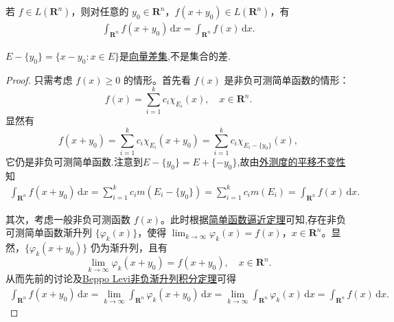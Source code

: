 \documentclass[../../main.tex]{subfiles}
\begin{document}
\begin{theorem}[积分变量的平移变换定理]\label{theorem:积分变量的平移变换定理}
若 $f \in L(\mathbf{R}^n)$，则对任意的 $y_0 \in \mathbf{R}^n$，$f(x + y_0) \in L(\mathbf{R}^n)$，有
\begin{align*}
\int_{\mathbf{R}^n} f(x + y_0) \, \mathrm{d}x = \int_{\mathbf{R}^n} f(x) \, \mathrm{d}x.
\end{align*}
\end{theorem}
\begin{remark}
$E-\{y_0\}=\{x-y_0:x\in E\}$是\hyperref[definition:向量差集]{向量差集},不是集合的差.
\end{remark}
\begin{proof}
只需考虑 $f(x) \geqslant 0$ 的情形。首先看 $f(x)$ 是非负可测简单函数的情形：
\[
f(x) = \sum_{i=1}^k c_i \chi_{E_i}(x), \quad x \in \mathbf{R}^n.
\]
显然有
\[
f(x+y_0)=\sum_{i=1}^k{c_i\chi _{E_i}(x+y_0)}=\sum_{i=1}^k{c_i\chi _{E_i-\{y_0\}}(x)},
\]
它仍是非负可测简单函数.注意到$E-\{y_0\}=E+\{-y_0\}$,故由\hyperref[theorem:外测度的平移不变性]{外测度的平移不变性}知
\begin{align*}
\int_{\mathbf{R}^n} f(x + y_0) \, \mathrm{d}x = \sum_{i=1}^k c_i m(E_i - \{ y_0 \})
= \sum_{i=1}^k c_i m(E_i) = \int_{\mathbf{R}^n} f(x) \, \mathrm{d}x.
\end{align*}

其次，考虑一般非负可测函数 $f(x)$。此时根据\hyperref[theorem:简单函数逼近定理]{简单函数逼近定理}可知,存在非负可测简单函数渐升列 $\{ \varphi_k(x) \}$，使得 $\lim_{k \to \infty} \varphi_k(x) = f(x)$，$x \in \mathbf{R}^n$。显然，$\{ \varphi_k(x + y_0) \}$ 仍为渐升列，且有
\[
\lim_{k \to \infty} \varphi_k(x + y_0) = f(x + y_0), \quad x \in \mathbf{R}^n.
\]
从而先前的讨论及\hyperref[theorem:Beppo Levi非负渐升列积分定理]{Beppo Levi非负渐升列积分定理}可得
\begin{align*}
\int_{\mathbf{R}^n} f(x + y_0) \, \mathrm{d}x = \lim_{k \to \infty} \int_{\mathbf{R}^n} \varphi_k(x + y_0) \, \mathrm{d}x 
= \lim_{k \to \infty} \int_{\mathbf{R}^n} \varphi_k(x) \, \mathrm{d}x = \int_{\mathbf{R}^n} f(x) \, \mathrm{d}x.
\end{align*}

\end{proof}
\end{document}

